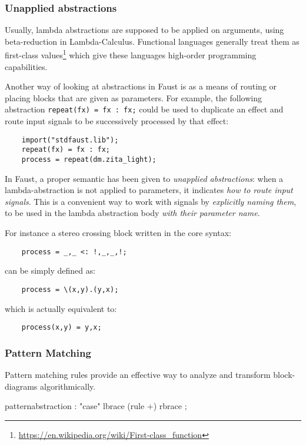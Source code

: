 \subsubsection{Unapplied abstractions}

Usually, lambda abstractions are supposed to be applied on arguments, using beta-reduction in Lambda-Calculus. Functional languages generally treat them as first-class values\footnote{\url{https://en.wikipedia.org/wiki/First-class_function}} which give these languages high-order programming capabilities. 

Another way of looking at abstractions in Faust is as a means of routing or placing blocks that are given as parameters. For example, the following abstraction \lstinline'repeat(fx) = fx : fx;' could be used to duplicate an effect and route input signals to be successively processed by that effect:

\begin{lstlisting}
	import("stdfaust.lib");
	repeat(fx) = fx : fx;
	process = repeat(dm.zita_light); 
\end{lstlisting}

In Faust, a proper semantic has been given to \textit{unapplied abstractions}: when a lambda-abstraction is not applied to parameters, it indicates \textit{how to route input signals}. This is a convenient way to work with signals by \textit{explicitly naming them}, to be used in the lambda abstraction body \textit{with their parameter name}. 

For instance a stereo crossing block written in the core syntax:

\begin{lstlisting}
	process = _,_ <: !,_,_,!; 
\end{lstlisting}

can be simply defined as:  

\begin{lstlisting}
	process = \(x,y).(y,x); 
\end{lstlisting}

which is actually equivalent to: 

\begin{lstlisting}
	process(x,y) = y,x; 
\end{lstlisting}


\subsubsection{Pattern Matching}
Pattern matching rules provide an effective way to analyze and transform block-diagrams algorithmically.
\begin{rail}
patternabstraction :  "case" lbrace (rule +) rbrace ;
\end{rail}

